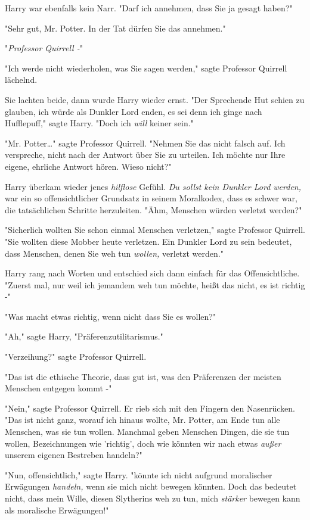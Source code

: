 {Harry war ebenfalls kein Narr. "Darf ich annehmen, dass Sie ja gesagt haben?"

"Sehr gut, Mr. Potter. In der Tat dürfen Sie das annehmen."

"\emph{Professor Quirrell -}"

"Ich werde nicht wiederholen, was Sie sagen werden," sagte Professor Quirrell lächelnd.

Sie lachten beide, dann wurde Harry wieder ernst. "Der Sprechende Hut schien zu glauben, ich würde als Dunkler Lord enden, es sei denn ich ginge nach Hufflepuff," sagte Harry. "Doch ich \emph{will} keiner sein."

"Mr. Potter…" sagte Professor Quirrell. "Nehmen Sie das nicht falsch auf. Ich verspreche, nicht nach der Antwort über Sie zu urteilen. Ich möchte nur Ihre eigene, ehrliche Antwort hören. Wieso nicht?"

Harry überkam wieder jenes \emph{hilflose} Gefühl. \emph{Du sollst kein Dunkler Lord werden,} war ein so offensichtlicher Grundsatz in seinem Moralkodex, dass es schwer war, die tatsächlichen Schritte herzuleiten. "Ähm, Menschen würden verletzt werden?"

"Sicherlich wollten Sie schon einmal Menschen verletzen," sagte Professor Quirrell. "Sie wollten diese Mobber heute verletzen. Ein Dunkler Lord zu sein bedeutet, dass Menschen, denen Sie weh tun \emph{wollen,} verletzt werden."

Harry rang nach Worten und entschied sich dann einfach für das Offensichtliche. "Zuerst mal, nur weil ich jemandem weh tun möchte, heißt das nicht, es ist richtig -"

"Was macht etwas richtig, wenn nicht dass Sie es wollen?"

"Ah," sagte Harry, "Präferenzutilitarismus."

"Verzeihung?" sagte Professor Quirrell.

"Das ist die ethische Theorie, dass gut ist, was den Präferenzen der meisten Menschen entgegen kommt -"

"Nein," sagte Professor Quirrell. Er rieb sich mit den Fingern den Nasenrücken. "Das ist nicht ganz, worauf ich hinaus wollte, Mr. Potter, am Ende tun alle Menschen, was sie tun wollen. Manchmal geben Menschen Dingen, die sie tun wollen, Bezeichnungen wie 'richtig', doch wie könnten wir nach etwas \emph{außer} unserem eigenen Bestreben handeln?"

"Nun, offensichtlich," sagte Harry. "könnte ich nicht aufgrund moralischer Erwägungen \emph{handeln,} wenn sie mich nicht bewegen könnten. Doch das bedeutet nicht, dass mein Wille, diesen Slytherins weh zu tun, mich \emph{stärker} bewegen kann als moralische Erwägungen!"

}

